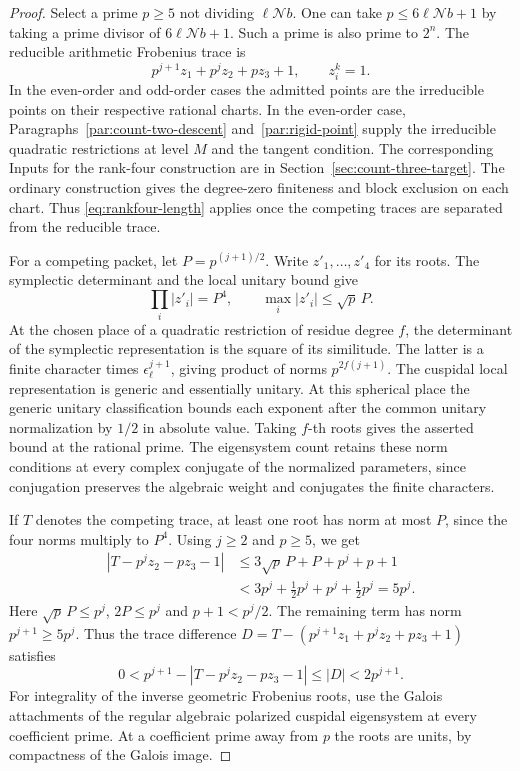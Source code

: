 \begin{proof}
Select a prime \(p\ge5\) not dividing \(\ell\mathcal N b\).
One can take \(p\le 6\ell\mathcal N b+1\) by taking a prime
divisor of \(6\ell\mathcal N b+1\). Such a prime is also
prime to \(2^n\). The reducible arithmetic Frobenius trace is
\[
                    p^{j+1}z_1+p^jz_2+pz_3+1,\qquad z_i^k=1 .
\]
In the even-order and odd-order cases the admitted points are the irreducible
points on their respective rational charts. In the even-order case,
Paragraphs~\ref{par:count-two-descent} and~\ref{par:rigid-point}
supply the irreducible quadratic restrictions at level \(M\)
and the tangent condition. The corresponding Inputs for the rank-four construction
are in Section~\ref{sec:count-three-target}. The ordinary
construction gives the degree-zero finiteness and block
exclusion on each chart. Thus \eqref{eq:rankfour-length} applies
once the competing traces are separated from the reducible trace.


For a competing packet, let \(P=p^{(j+1)/2}\).
Write \(z'_1,\ldots,z'_4\) for its roots. The symplectic
determinant and the local unitary bound give
\[
          \prod_i|z'_i|=P^4,\qquad \max_i|z'_i|\le\sqrt p\,P .
\]
At the chosen place of a quadratic restriction of residue
degree \(f\), the determinant of the symplectic representation
is the square of its similitude. The latter is a finite
character times \(\epsilon_\ell^{j+1}\), giving product
of norms \(p^{2f(j+1)}\). The cuspidal local representation
is generic and essentially unitary. At this spherical place
the generic unitary classification bounds each exponent
after the common unitary normalization by \(1/2\) in
absolute value. Taking \(f\)-th roots gives the asserted
bound at the rational prime. The eigensystem count retains
these norm conditions at every complex conjugate of the
normalized parameters, since conjugation preserves the
algebraic weight and conjugates the finite characters.

If \(T\) denotes the competing trace, at least one root
has norm at most \(P\), since the four norms multiply to
\(P^4\). Using \(j\ge2\) and \(p\ge5\), we get
\[
 \begin{aligned}
 |T-p^jz_2-pz_3-1|
    &\le 3\sqrt p\,P+P+p^j+p+1\\
    &<3p^j+\tfrac12p^j+p^j+\tfrac12p^j=5p^j.
 \end{aligned}
\]
Here \(\sqrt p\,P\le p^j\), \(2P\le p^j\) and
\(p+1<p^j/2\). The remaining term has norm \(p^{j+1}\ge5p^j\). Thus the
trace difference \(D=T-(p^{j+1}z_1+p^jz_2+pz_3+1)\) satisfies
\[
        0<p^{j+1}-|T-p^jz_2-pz_3-1|\le|D|<2p^{j+1}.
\]
For integrality of the inverse geometric Frobenius roots,
use the Galois attachments of the regular algebraic polarized
cuspidal eigensystem at every coefficient prime. At a
coefficient prime away from \(p\) the roots are units,
by compactness of the Galois image.


\end{proof}
